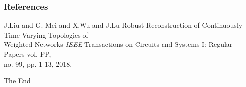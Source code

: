 \documentclass{beamer}
\begin{document}

\begin{frame}
\frametitle{References}
\begin{thebibliography}{99} %
 J.Liu and G. Mei and  X.Wu and J.Lu 
\newblock Robust Reconstruction of Continuously Time-Varying Topologies of \\Weighted Networks
\newblock \emph {IEEE} Transactions on Circuits and Systems I: Regular Papers vol. PP,\\no. 99, pp. 1-13, 2018.


\end{thebibliography}
\end{frame}


\begin{frame}
\Huge{\centerline{The End}}
\end{frame}

\end{document}

